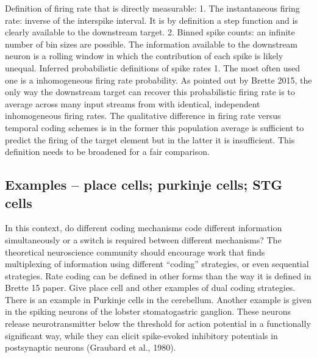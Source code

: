 \documentclass[12pt]{article}
\begin{document}
Definition of firing rate that is directly measurable:
1. The instantaneous firing rate: inverse of the interspike interval. It is by definition a step function and is clearly available to the downstream target. 
2. Binned spike counts: an infinite number of bin sizes are possible. The information available to the downstream neuron is a rolling window in which the contribution of each
spike is likely unequal.
Inferred probabilistic definitions of spike rates
1. The most often used one is a inhomogeneous firing rate probability. As pointed out by Brette 2015, the only way the downstream target can recover this probabilistic firing
rate is to average across many input streams from with identical, independent inhomogeneous firing rates. The qualitative difference in firing rate versus temporal coding
schemes is in the former this population average is sufficient to predict the firing of the target element but in the latter it is insufficient. This definition needs to be
broadened for a fair comparison.

\subsection{Examples -- place cells; purkinje cells; STG cells}
In this context, do different coding mechanisms code different information simultaneously or a switch is required between different mechanisms?
The theoretical neuroscience community should encourage work that finds multiplexing of information using different “coding” strategies, or even sequential strategies. Rate
coding can be defined in other forms than the way it is defined in Brette 15 paper. Give place cell and other examples of dual coding strategies. There is an example in
Purkinje cells in the cerebellum. Another example is given in the spiking neurons of the lobster stomatogastric ganglion. These neurons release neurotransmitter below the
threshold for action potential in a functionally significant way, while they can elicit spike-evoked inhibitory potentials in postsynaptic neurons (Graubard et al., 1980).

\end{document}
